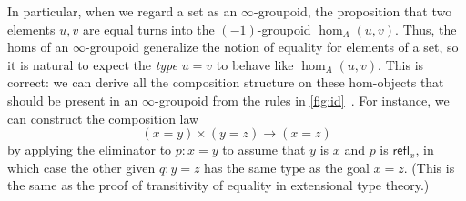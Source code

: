 \documentclass[12pt]{article}
\def\oo{\ensuremath{\infty}}
\def\io{\ensuremath{(\oo,1)}}
\def\refl{\mathsf{refl}}
\def\types{\vdash}
\numberwithin{equation}{section}
\begin{document}



In particular, when we regard a set as an \oo-groupoid, the proposition that two elements $u,v$ are equal turns into the $(-1)$-groupoid $\hom_A(u,v)$.
Thus, the homs of an \oo-groupoid generalize the notion of equality for elements of a set, so it is natural to expect the \emph{type} $u=v$ to behave like $\hom_A(u,v)$.
This is correct: we can derive all the composition structure on these hom-objects that should be present in an \oo-groupoid %
from the rules in \cref{fig:id}~\cite{pll:wkom-type,bg:type-wkom}.
For instance, we can construct the composition law
\[ (x=y) \times (y=z) \to (x=z) \]
by applying the eliminator to $p:x=y$ to assume that $y$ is $x$ and $p$ is $\refl_x$, in which case the other given $q:y=z$ has the same type as the goal $x=z$. %
(This is the same as the proof of transitivity of equality in extensional type theory.)
\end{document}
